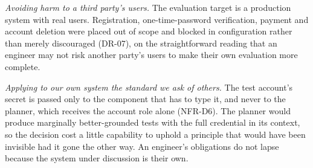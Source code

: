 \emph{Avoiding harm to a third party's users.} The evaluation target is a
production system with real users. Registration, one-time-password
verification, payment and account deletion were placed out of scope and blocked
in configuration rather than merely discouraged (DR-07), on the straightforward
reading that an engineer may not risk another party's users to make their own
evaluation more complete.

\emph{Applying to our own system the standard we ask of others.} The test account's secret is passed only to the component that has to type it, and never to the planner, which receives the account role alone (NFR-D6). The planner would produce marginally better-grounded tests with the full credential in its context, so the decision cost a little capability to uphold a principle that would have been invisible had it gone the other way. An engineer's obligations do not lapse because the system under discussion is their own.
